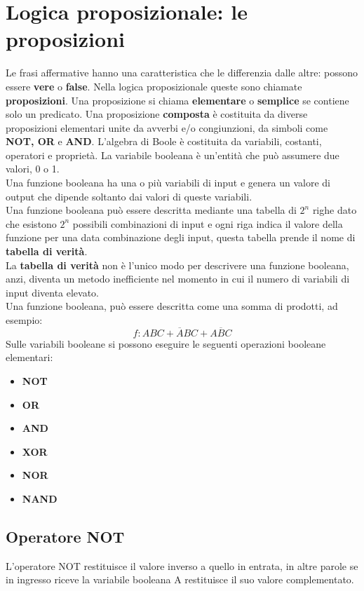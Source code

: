 \documentclass[12pt]{report}
\begin{document}
		\section{Logica proposizionale: le proposizioni}
			Le frasi affermative hanno una caratteristica che le differenzia dalle altre: possono essere \textbf{vere} o \textbf{false}.
			Nella logica proposizionale queste sono chiamate \textbf{proposizioni}.
			Una proposizione si chiama \textbf{elementare} o \textbf{semplice} se contiene solo un predicato.
			Una proposizione \textbf{composta} è costituita da diverse proposizioni elementari unite da avverbi e/o congiunzioni, da simboli come \textbf{NOT, OR} e \textbf{AND}.
			L'algebra di Boole è costituita da variabili, costanti, operatori e proprietà.
			La variabile booleana è un'entità che può assumere due valori, 0 o 1. \\
			Una funzione booleana ha una o più variabili di input e genera un valore di output che dipende soltanto dai valori di queste variabili. \\
			Una funzione booleana può essere descritta mediante una tabella di $2^n$ righe dato che esistono $2^n$ possibili combinazioni di input e ogni riga indica il valore della funzione per una data combinazione degli input, questa tabella prende il nome di \textbf{tabella di verità}. \\
			La \textbf{tabella di verità} non è l'unico modo per descrivere una funzione booleana, anzi, diventa un metodo inefficiente nel momento in cui il numero di variabili di input diventa elevato. \\
			Una funzione booleana, può essere descritta come una somma di prodotti, ad esempio:
			\[
			f: ABC + \overline{A}BC + \overline{ABC}
			\]
			Sulle variabili booleane si possono eseguire le seguenti operazioni booleane elementari:
			\begin{itemize}
				\item \textbf{NOT}
				\item \textbf{OR}
				\item \textbf{AND}
				\item \textbf{XOR}
				\item \textbf{NOR}
				\item \textbf{NAND}
			\end{itemize}
			\subsection{Operatore NOT}
			L'operatore NOT restituisce il valore inverso a quello in entrata, in altre parole se in ingresso riceve la variabile booleana A restituisce il suo valore complementato.
			\\
			\\
\end{document}
